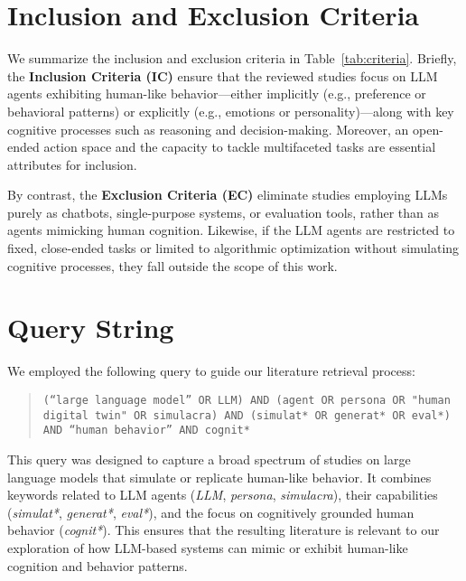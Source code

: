 \clearpage
\appendix

\section{Inclusion and Exclusion Criteria}
\label{tab: inclusion and exclusion criteria}


We summarize the inclusion and exclusion criteria in Table~\ref{tab:criteria}. Briefly, the \textbf{Inclusion Criteria (IC)} ensure that the reviewed studies focus on LLM agents exhibiting human-like behavior—either implicitly (e.g., preference or behavioral patterns) or explicitly (e.g., emotions or personality)—along with key cognitive processes such as reasoning and decision-making. Moreover, an open-ended action space and the capacity to tackle multifaceted tasks are essential attributes for inclusion.

By contrast, the \textbf{Exclusion Criteria (EC)} eliminate studies employing LLMs purely as chatbots, single-purpose systems, or evaluation tools, rather than as agents mimicking human cognition. Likewise, if the LLM agents are restricted to fixed, close-ended tasks or limited to algorithmic optimization without simulating cognitive processes, they fall outside the scope of this work.


\section{Query String}
\label{query string}

We employed the following query to guide our literature retrieval process:

\begin{quote}
\texttt{(“large language model” OR LLM) AND (agent OR persona OR "human digital twin" OR simulacra) AND (simulat* OR generat* OR eval*) AND “human behavior” AND cognit*}
\end{quote}

This query was designed to capture a broad spectrum of studies on large language models that simulate or replicate human-like behavior. It combines keywords related to LLM agents (\emph{LLM}, \emph{persona}, \emph{simulacra}), their capabilities (\emph{simulat*}, \emph{generat*}, \emph{eval*}), and the focus on cognitively grounded human behavior (\emph{cognit*}). This ensures that the resulting literature is relevant to our exploration of how LLM-based systems can mimic or exhibit human-like cognition and behavior patterns.


